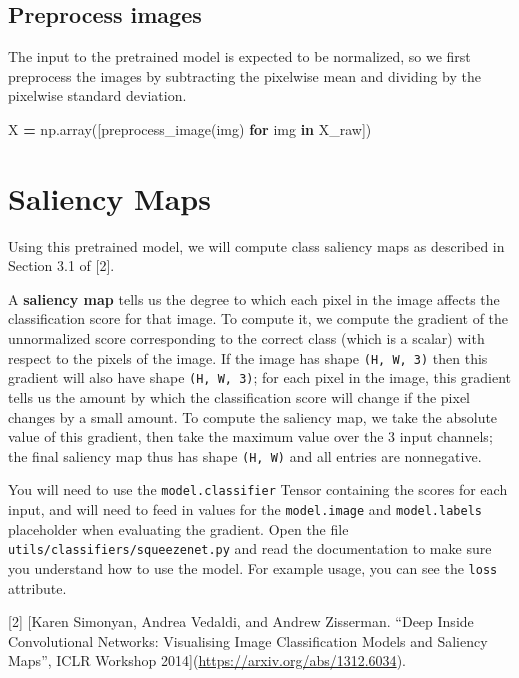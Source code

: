 \documentclass[]{book}
\newenvironment{Shaded}{\begin{snugshade}}{\end{snugshade}}
\newcommand{\KeywordTok}[1]{\textcolor[rgb]{0.13,0.29,0.53}{\textbf{#1}}}
\newcommand{\ControlFlowTok}[1]{\textcolor[rgb]{0.13,0.29,0.53}{\textbf{#1}}}
\newcommand{\OperatorTok}[1]{\textcolor[rgb]{0.81,0.36,0.00}{\textbf{#1}}}
\newcommand{\NormalTok}[1]{#1}
\theoremstyle{definition}
\theoremstyle{definition}
\theoremstyle{definition}
\theoremstyle{remark}
\begin{document}
\section{Preprocess images}\label{preprocess-images}

The input to the pretrained model is expected to be normalized, so we
first preprocess the images by subtracting the pixelwise mean and
dividing by the pixelwise standard deviation.

\begin{Shaded}
\begin{Highlighting}[]
\NormalTok{X }\OperatorTok{=}\NormalTok{ np.array([preprocess_image(img) }\ControlFlowTok{for}\NormalTok{ img }\KeywordTok{in}\NormalTok{ X_raw])}
\end{Highlighting}
\end{Shaded}

\chapter{Saliency Maps}\label{saliency-maps}

Using this pretrained model, we will compute class saliency maps as
described in Section 3.1 of {[}2{]}.

A \textbf{saliency map} tells us the degree to which each pixel in the
image affects the classification score for that image. To compute it, we
compute the gradient of the unnormalized score corresponding to the
correct class (which is a scalar) with respect to the pixels of the
image. If the image has shape \texttt{(H,\ W,\ 3)} then this gradient
will also have shape \texttt{(H,\ W,\ 3)}; for each pixel in the image,
this gradient tells us the amount by which the classification score will
change if the pixel changes by a small amount. To compute the saliency
map, we take the absolute value of this gradient, then take the maximum
value over the 3 input channels; the final saliency map thus has shape
\texttt{(H,\ W)} and all entries are nonnegative.

You will need to use the \texttt{model.classifier} Tensor containing the
scores for each input, and will need to feed in values for the
\texttt{model.image} and \texttt{model.labels} placeholder when
evaluating the gradient. Open the file
\texttt{utils/classifiers/squeezenet.py} and read the documentation to
make sure you understand how to use the model. For example usage, you
can see the \texttt{loss} attribute.

{[}2{]} {[}Karen Simonyan, Andrea Vedaldi, and Andrew Zisserman. ``Deep
Inside Convolutional Networks: Visualising Image Classification Models
and Saliency Maps'', ICLR Workshop
2014{]}(\url{https://arxiv.org/abs/1312.6034}).
\end{document}
